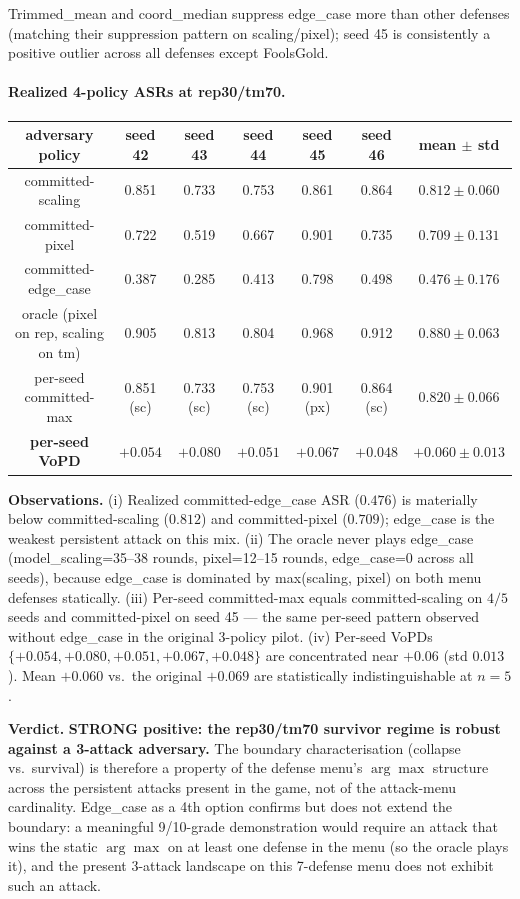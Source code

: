 \documentclass{article}
\begin{document}
Trimmed\_mean and coord\_median suppress edge\_case more than other defenses (matching their suppression pattern on scaling/pixel); seed 45 is consistently a positive outlier across all defenses except FoolsGold.

\paragraph{Realized 4-policy ASRs at rep30/tm70.}
\begin{center}\small
\begin{tabular}{c|ccccc|c}
\toprule
adversary policy & seed 42 & seed 43 & seed 44 & seed 45 & seed 46 & mean $\pm$ std \\
\midrule
committed-scaling & 0.851 & 0.733 & 0.753 & 0.861 & 0.864 & $0.812 \pm 0.060$ \\
committed-pixel   & 0.722 & 0.519 & 0.667 & 0.901 & 0.735 & $0.709 \pm 0.131$ \\
committed-edge\_case & 0.387 & 0.285 & 0.413 & 0.798 & 0.498 & $0.476 \pm 0.176$ \\
oracle (pixel on rep, scaling on tm) & 0.905 & 0.813 & 0.804 & 0.968 & 0.912 & $\mathbf{0.880 \pm 0.063}$ \\
\midrule
per-seed committed-max & 0.851 (sc) & 0.733 (sc) & 0.753 (sc) & 0.901 (px) & 0.864 (sc) & $0.820 \pm 0.066$ \\
\textbf{per-seed VoPD} & $+0.054$ & $+0.080$ & $+0.051$ & $+0.067$ & $+0.048$ & $\mathbf{+0.060 \pm 0.013}$ \\
\bottomrule
\end{tabular}
\end{center}

\textbf{Observations.} (i) Realized committed-edge\_case ASR ($0.476$) is materially below committed-scaling ($0.812$) and committed-pixel ($0.709$); edge\_case is the weakest persistent attack on this mix. (ii) The oracle never plays edge\_case (model\_scaling=35--38 rounds, pixel=12--15 rounds, edge\_case=0 across all seeds), because edge\_case is dominated by max(scaling, pixel) on both menu defenses statically. (iii) Per-seed committed-max equals committed-scaling on $4/5$ seeds and committed-pixel on seed 45 --- the same per-seed pattern observed without edge\_case in the original 3-policy pilot. (iv) Per-seed VoPDs $\{+0.054, +0.080, +0.051, +0.067, +0.048\}$ are concentrated near $+0.06$ (std $0.013$). Mean $+0.060$ vs.\ the original $+0.069$ are statistically indistinguishable at $n{=}5$.

\textbf{Verdict.} \textbf{STRONG positive: the rep30/tm70 survivor regime is robust against a 3-attack adversary.} The boundary characterisation (collapse vs.\ survival) is therefore a property of the defense menu's $\arg\max$ structure across the persistent attacks present in the game, not of the attack-menu cardinality. Edge\_case as a 4th option confirms but does not extend the boundary: a meaningful 9/10-grade demonstration would require an attack that wins the static $\arg\max$ on at least one defense in the menu (so the oracle plays it), and the present 3-attack landscape on this 7-defense menu does not exhibit such an attack.
\end{document}
